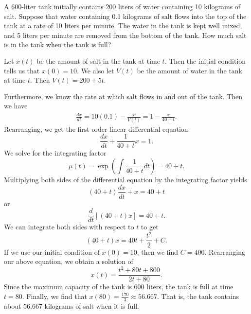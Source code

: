 \documentclass[11pt, titlepage]{article}
\begin{document}
  \pagebreak

  \begin{problem}[Judson 1.5.21]
    A 600-liter tank initially contains 200 liters of water containing 10 kilograms of salt.
    Suppose that water containing 0.1 kilograms of salt flows into the top of the tank at a rate of 10 liters per minute.
    The water in the tank is kept well mixed, and 5 liters per minute are removed from the bottom of the tank.
    How much salt is in the tank when the tank is full?
  \end{problem}

  \begin{solution}
    Let \(x(t)\) be the amount of salt in the tank at time \(t\).
    Then the initial condition tells us that \(x(0) = 10\).
    We also let \(V(t)\) be the amount of water in the tank at time \(t\).
    Then \(V(t) = 200 + 5t\).

    Furthermore, we know the rate at which salt flows in and out of the tank.
    Then we have
    \begin{gather*}
      \frac{dx}{dt} = 10 (0.1) - \frac{5x}{V(t)} = 1 - \frac{x}{40 + t}.
    \end{gather*}
    Rearranging, we get the first order linear differential equation
    \begin{equation*}
      \frac{dx}{dt} + \frac{1}{40 + t} x = 1.
    \end{equation*}
    We solve for the integrating factor
    \begin{equation*}
      \mu(t) = \exp \left( \int \frac{1}{40 + t} dt \right) = 40 + t.
    \end{equation*}
    Multiplying both sides of the differential equation by the integrating factor yields
    \begin{equation*}
      (40 + t) \frac{dx}{dt} + x = 40 + t
    \end{equation*}
    or
    \begin{equation*}
      \frac{d}{dt}\left[ (40 + t) x \right] = 40 + t.
    \end{equation*}
    We can integrate both sides with respect to \(t\) to get
    \begin{equation*}
      (40 + t) x = 40t + \frac{t^{2}}{2} + C.
    \end{equation*}
    If we use our initial condition of \(x(0) = 10\), then we find \(C = 400\).
    Rearranging our above equation, we obtain a solution of
    \begin{equation*}
      x(t) = \frac{t^{2}  + 80t + 800}{2t + 80}.
    \end{equation*}
    Since the maximum capacity of the tank is 600 liters, the tank is full at time \(t = 80\).
    Finally, we find that \(x(80) = \frac{170}{3} \approx 56.667\).
    That is, the tank contains about 56.667 kilograms of salt when it is full.
  \end{solution}
\end{document}
